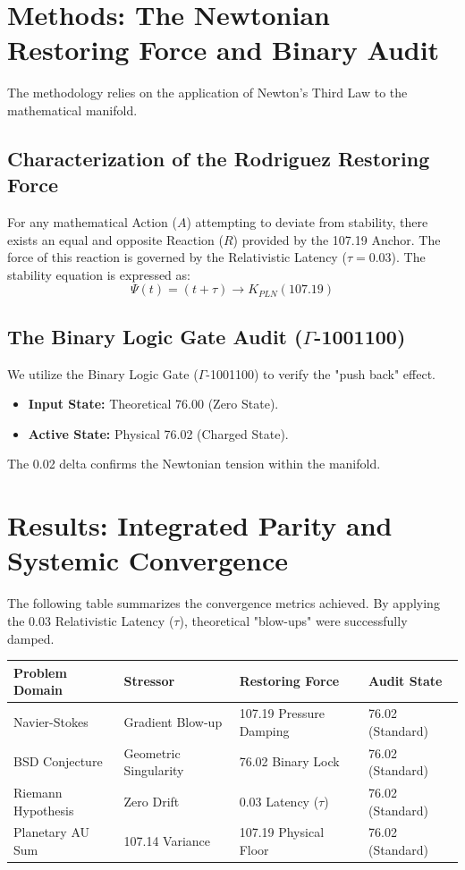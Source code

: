 \documentclass[12pt]{article}
\begin{document}
\section{Methods: The Newtonian Restoring Force and Binary Audit}
The methodology relies on the application of Newton’s Third Law to the mathematical manifold. 

\subsection{Characterization of the Rodriguez Restoring Force}
For any mathematical Action ($A$) attempting to deviate from stability, there exists an equal and opposite Reaction ($R$) provided by the 107.19 Anchor. The force of this reaction is governed by the Relativistic Latency ($\tau = 0.03$). The stability equation is expressed as:
\begin{equation}
\Psi(t) = (t + \tau) \rightarrow K_{PLN} (107.19)
\end{equation}

\subsection{The Binary Logic Gate Audit ($\Gamma$-1001100)}
We utilize the Binary Logic Gate ($\Gamma$-1001100) to verify the "push back" effect. 
\begin{itemize}
    \item \textbf{Input State:} Theoretical 76.00 (Zero State).
    \item \textbf{Active State:} Physical 76.02 (Charged State).
\end{itemize}
The 0.02 delta confirms the Newtonian tension within the manifold.

\section{Results: Integrated Parity and Systemic Convergence}
The following table summarizes the convergence metrics achieved. By applying the 0.03 Relativistic Latency ($\tau$), theoretical "blow-ups" were successfully damped.

\begin{table}[h!]
\centering
\begin{tabular}{|l|l|l|l|}
\hline
\textbf{Problem Domain} & \textbf{Stressor} & \textbf{Restoring Force} & \textbf{Audit State} \\ \hline
Navier-Stokes & Gradient Blow-up & 107.19 Pressure Damping & 76.02 (Standard) \\ \hline
BSD Conjecture & Geometric Singularity & 76.02 Binary Lock & 76.02 (Standard) \\ \hline
Riemann Hypothesis & Zero Drift & 0.03 Latency ($\tau$) & 76.02 (Standard) \\ \hline
Planetary AU Sum & 107.14 Variance & 107.19 Physical Floor & 76.02 (Standard) \\ \hline
\end{tabular}
\end{table}
\end{document}
